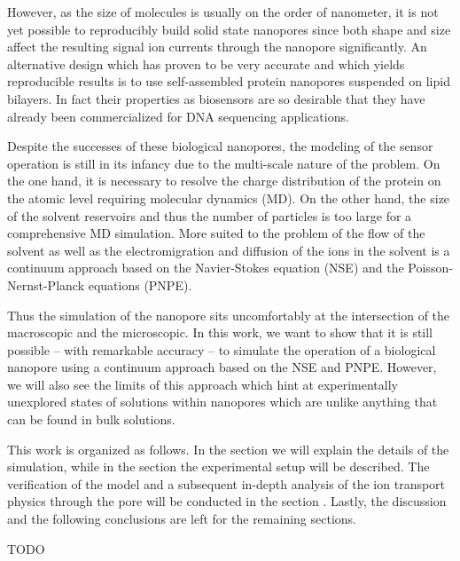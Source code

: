 \documentclass[journal=ancac3, manuscript=article, etalmode=truncate,maxauthors=0]{achemso}
\begin{document}
However, as the size of molecules is usually on the order of nanometer, it is not yet possible to reproducibly
build solid state nanopores\cite{} since both shape and size affect the resulting signal ion currents through
the nanopore significantly. An alternative design which has proven to be very accurate and which yields
reproducible results is to use self-assembled protein nanopores suspended on lipid bilayers\cite{deam2016}.
In fact their properties as biosensors are so desirable that they have already been commercialized for DNA
sequencing applications\cite{}. 

Despite the successes of these biological nanopores, the modeling of the sensor operation is still
in its infancy due to the multi-scale nature of the problem. On the one hand, it is necessary to
resolve the charge distribution of the protein on the atomic level requiring molecular dynamics
(MD).\cite{}  On the other hand, the size of the solvent reservoirs and thus the number of
particles is too large for a comprehensive MD simulation. More suited to the problem of the
flow of the solvent as well as the electromigration and diffusion of the ions in the solvent is a
continuum approach based on the Navier-Stokes equation (NSE) and the Poisson-Nernst-Planck equations
(PNPE).\cite{}

Thus the simulation of the nanopore sits uncomfortably at the intersection of the macroscopic and the
microscopic. In this work, we want to show that it is still possible -- with remarkable accuracy --
to simulate the operation of a biological nanopore using a continuum approach based on the NSE and
PNPE. However, we will also see the limits of this approach which hint at experimentally unexplored states of
solutions within nanopores which are unlike anything that can be found in bulk solutions.

This work is organized as follows. In the section \emph{} we will explain the
details of the simulation, while in the section \emph{} the experimental setup will
be described. The verification of the model and a subsequent in-depth analysis of the ion transport physics
through the pore will be conducted in the section \emph{}. Lastly, the discussion and
the following conclusions are left for the remaining sections.


TODO
\end{document}
